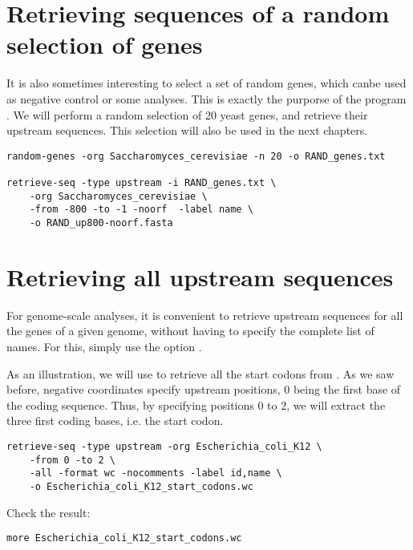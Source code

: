\section{Retrieving sequences of a random selection of genes}

It is also sometimes interesting to select a set of random genes,
which canbe used as negative control or some analyses. This is exactly
the purporse of the program . We will perform a
random selection of 20 yeast genes, and retrieve their upstream
sequences. This selection will also be used in the next chapters.


{\color{Blue} \begin{footnotesize}
\begin{verbatim}
random-genes -org Saccharomyces_cerevisiae -n 20 -o RAND_genes.txt

retrieve-seq -type upstream -i RAND_genes.txt \
    -org Saccharomyces_cerevisiae \
    -from -800 -to -1 -noorf  -label name \
    -o RAND_up800-noorf.fasta
\end{verbatim} \end{footnotesize}
}

\section{Retrieving all upstream sequences}

For genome-scale analyses, it is convenient to retrieve upstream
sequences for all the genes of a given genome, without having to
specify the complete list of names. For this, simply use the option
\option{-all}.

As an illustration, we will use \command{retrieve-seq} to retrieve all
the start codons from . As we saw before,
negative coordinates specify upstream positions, 0 being the first
base of the coding sequence. Thus, by specifying positions 0 to 2, we
will extract the three first coding bases, i.e. the start codon. 

{\color{Blue} \begin{footnotesize}
\begin{verbatim}
retrieve-seq -type upstream -org Escherichia_coli_K12 \
    -from 0 -to 2 \
    -all -format wc -nocomments -label id,name \
    -o Escherichia_coli_K12_start_codons.wc
\end{verbatim} \end{footnotesize}
}

Check the result:

{\color{Blue} \begin{footnotesize}
\begin{verbatim}
more Escherichia_coli_K12_start_codons.wc
\end{verbatim} \end{footnotesize}
}



